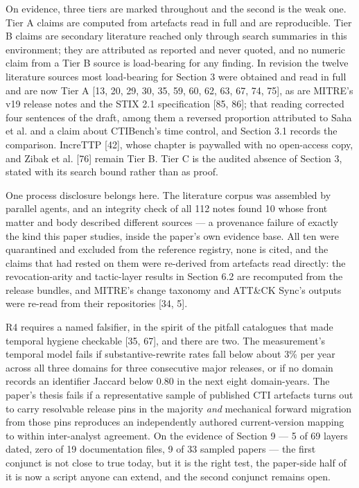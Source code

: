 \documentclass[11pt,a4paper]{article}
\begin{document}
On evidence, three tiers are marked throughout and the second is the weak one. Tier A claims are computed from artefacts read in full and are reproducible. Tier B claims are secondary literature reached only through search summaries in this environment; they are attributed as reported and never quoted, and no numeric claim from a Tier B source is load-bearing for any finding. In revision the twelve literature sources most load-bearing for Section 3 were obtained and read in full and are now Tier A [13, 20, 29, 30, 35, 59, 60, 62, 63, 67, 74, 75], as are MITRE's v19 release notes and the STIX 2.1 specification [85, 86]; that reading corrected four sentences of the draft, among them a reversed proportion attributed to Saha et al. and a claim about CTIBench's time control, and Section 3.1 records the comparison. IncreTTP [42], whose chapter is paywalled with no open-access copy, and Zibak et al. [76] remain Tier B. Tier C is the audited absence of Section 3, stated with its search bound rather than as proof.

One process disclosure belongs here. The literature corpus was assembled by parallel agents, and an integrity check of all 112 notes found 10 whose front matter and body described different sources — a provenance failure of exactly the kind this paper studies, inside the paper's own evidence base. All ten were quarantined and excluded from the reference registry, none is cited, and the claims that had rested on them were re-derived from artefacts read directly: the revocation-arity and tactic-layer results in Section 6.2 are recomputed from the release bundles, and MITRE's change taxonomy and ATT\&CK Sync's outputs were re-read from their repositories [34, 5].

R4 requires a named falsifier, in the spirit of the pitfall catalogues that made temporal hygiene checkable [35, 67], and there are two. The measurement's temporal model fails if substantive-rewrite rates fall below about 3\% per year across all three domains for three consecutive major releases, or if no domain records an identifier Jaccard below 0.80 in the next eight domain-years. The paper's thesis fails if a representative sample of published CTI artefacts turns out to carry resolvable release pins in the majority \emph{and} mechanical forward migration from those pins reproduces an independently authored current-version mapping to within inter-analyst agreement. On the evidence of Section 9 — 5 of 69 layers dated, zero of 19 documentation files, 9 of 33 sampled papers — the first conjunct is not close to true today, but it is the right test, the paper-side half of it is now a script anyone can extend, and the second conjunct remains open.
\end{document}
